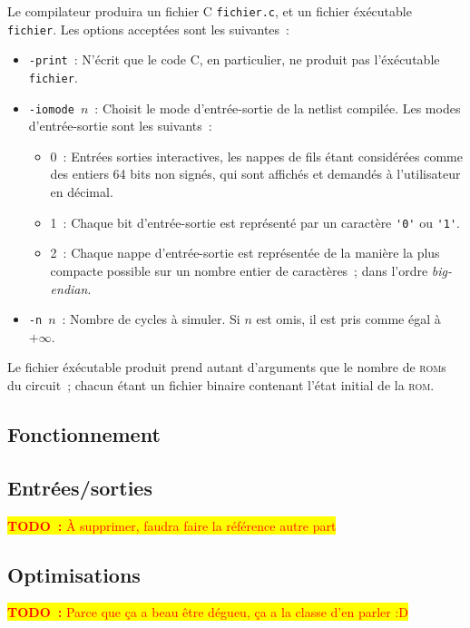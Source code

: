 \documentclass[11pt,a4paper]{article}
\newcommand{\todo}[1]{\colorbox{yellow}{\textcolor{red}{\textbf{TODO~:} #1}}}
\begin{document}

Le compilateur produira un fichier C \verb!fichier.c!, et un fichier
éxécutable \verb!fichier!. Les options acceptées sont les suivantes~:
\begin{itemize}
\item{\verb!-print!~: N'écrit que le code C, en particulier, ne
    produit pas l'éxécutable \verb!fichier!.}
\item{\verb!-iomode!~$n$~: Choisit le mode d'entrée-sortie de la
    netlist compilée. Les modes d'entrée-sortie sont les suivants~:
    \begin{itemize}
    \item{0~: Entrées sorties interactives, les nappes de fils étant
        considérées comme des entiers 64 bits non signés, qui sont
        affichés et demandés à l'utilisateur en décimal.}
    \item{1~: Chaque bit d'entrée-sortie est représenté par un
        caractère \verb!'0'! ou \verb!'1'!.}
    \item{2~: Chaque nappe d'entrée-sortie est représentée de la
        manière la plus compacte possible sur un nombre entier de
        caractères~; dans l'ordre \textit{big-endian}.}
    \end{itemize}
}
\item{\verb!-n!~$n$~: Nombre de cycles à simuler. Si $n$ est omis, il
    est pris comme égal à $+\infty$.}
\end{itemize}

Le fichier éxécutable produit prend autant d'arguments que le nombre
de \textsc{rom}s du circuit~; chacun étant un fichier binaire
contenant l'état initial de la \textsc{rom}.

\subsection{Fonctionnement}

\subsection{Entrées/sorties} \label{ssec:compilo_io}
\todo{À supprimer, faudra faire la référence autre part}

\subsection{Optimisations}
\todo{Parce que ça a beau être dégueu, ça a la classe d'en parler :D}
\end{document}
